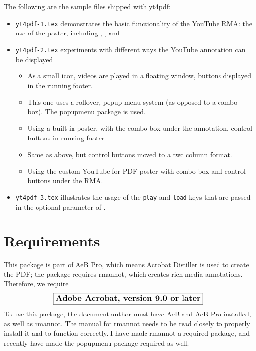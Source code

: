 \documentclass{article}
\newcommand{\YouTube}{\textsf{YouTube}}
\begin{document}
The following are the sample files shipped with \textsf{yt4pdf}:
\begin{itemize}
    \item \texttt{yt4pdf-1.tex} demonstrates the basic functionality of
    the {\YouTube} RMA: the use of the poster, including ,
    , and .
    \item \texttt{yt4pdf-2.tex} experiments with different ways the
    {\YouTube} annotation can be displayed
    \begin{itemize}
        \item As a small icon, videos are played in a floating window,
        buttons displayed in the running footer.
        \item[] This one uses a rollover, popup menu system (as opposed to
        a combo box). The \textsf{popupmenu} package is used.
        \item Using a built-in poster, with the combo box under the
        annotation, control buttons in running footer.
        \item Same as above, but control buttons moved to a two column
        format.
        \item Using the custom {\YouTube} for PDF poster with combo box and
        control buttons under the RMA.
    \end{itemize}
    \item \texttt{yt4pdf-3.tex} illustrates the usage of the \texttt{play} and \texttt{load}
    keys that are passed in the optional parameter of .
\end{itemize}

\section{Requirements}

This package is part of \textsf{AeB Pro}, which means Acrobat Distiller is
used to create the PDF; the package requires \textsf{rmannot}, which
creates rich media annotations. Therefore, we require
\begin{equation*}
    \boxed{\text{\large\bfseries Adobe Acrobat, version 9.0 or later}}
\end{equation*}
To use this package, the document author must have AeB and AeB Pro
installed, as well as \textsf{rmannot}. The manual for \textsf{rmannot}
needs to be read closely to properly install it and to function correctly.
I have made \textsf{rmannot} a required package, and recently
have made the \textsf{popupmenu} package required as well.
\end{document}
